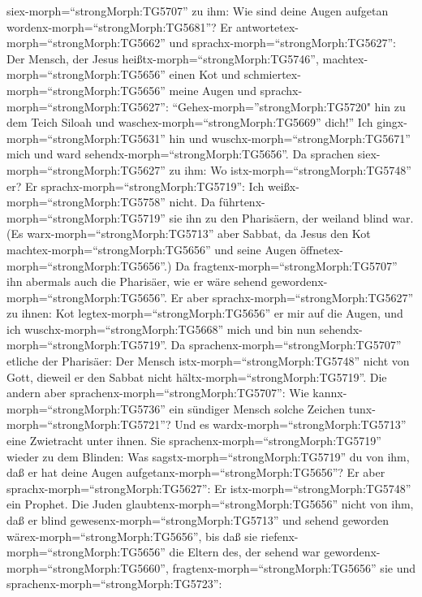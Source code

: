 siex-morph=``strongMorph:TG5707'' zu ihm: Wie sind deine Augen aufgetan
wordenx-morph=``strongMorph:TG5681''?  Er
antwortetex-morph=``strongMorph:TG5662'' und
sprachx-morph=``strongMorph:TG5627'': Der Mensch, der Jesus
heißtx-morph=``strongMorph:TG5746'',
machtex-morph=``strongMorph:TG5656'' einen Kot und
schmiertex-morph=``strongMorph:TG5656'' meine Augen und
sprachx-morph=``strongMorph:TG5627'':
``Gehex-morph=''strongMorph:TG5720" hin zu dem Teich Siloah und
waschex-morph=``strongMorph:TG5669'' dich!'' Ich
gingx-morph=``strongMorph:TG5631'' hin und
wuschx-morph=``strongMorph:TG5671'' mich und ward
sehendx-morph=``strongMorph:TG5656''.  Da sprachen
siex-morph=``strongMorph:TG5627'' zu ihm: Wo
istx-morph=``strongMorph:TG5748'' er? Er
sprachx-morph=``strongMorph:TG5719'': Ich
weißx-morph=``strongMorph:TG5758'' nicht.  Da
führtenx-morph=``strongMorph:TG5719'' sie ihn zu den Pharisäern, der
weiland blind war.  (Es warx-morph=``strongMorph:TG5713''
aber Sabbat, da Jesus den Kot machtex-morph=``strongMorph:TG5656'' und
seine Augen öffnetex-morph=``strongMorph:TG5656''.)  Da
fragtenx-morph=``strongMorph:TG5707'' ihn abermals auch die Pharisäer,
wie er wäre sehend gewordenx-morph=``strongMorph:TG5656''. Er aber
sprachx-morph=``strongMorph:TG5627'' zu ihnen: Kot
legtex-morph=``strongMorph:TG5656'' er mir auf die Augen, und ich
wuschx-morph=``strongMorph:TG5668'' mich und bin nun
sehendx-morph=``strongMorph:TG5719''.  Da
sprachenx-morph=``strongMorph:TG5707'' etliche der Pharisäer: Der Mensch
istx-morph=``strongMorph:TG5748'' nicht von Gott, dieweil er den Sabbat
nicht hältx-morph=``strongMorph:TG5719''. Die andern aber
sprachenx-morph=``strongMorph:TG5707'': Wie
kannx-morph=``strongMorph:TG5736'' ein sündiger Mensch solche Zeichen
tunx-morph=``strongMorph:TG5721''? Und es
wardx-morph=``strongMorph:TG5713'' eine Zwietracht unter ihnen.
 Sie sprachenx-morph=``strongMorph:TG5719'' wieder zu dem
Blinden: Was sagstx-morph=``strongMorph:TG5719'' du von ihm, daß er hat
deine Augen aufgetanx-morph=``strongMorph:TG5656''? Er aber
sprachx-morph=``strongMorph:TG5627'': Er
istx-morph=``strongMorph:TG5748'' ein Prophet.  Die Juden
glaubtenx-morph=``strongMorph:TG5656'' nicht von ihm, daß er blind
gewesenx-morph=``strongMorph:TG5713'' und sehend geworden
wärex-morph=``strongMorph:TG5656'', bis daß sie
riefenx-morph=``strongMorph:TG5656'' die Eltern des, der sehend war
gewordenx-morph=``strongMorph:TG5660'', 
fragtenx-morph=``strongMorph:TG5656'' sie und
sprachenx-morph=``strongMorph:TG5723'':

